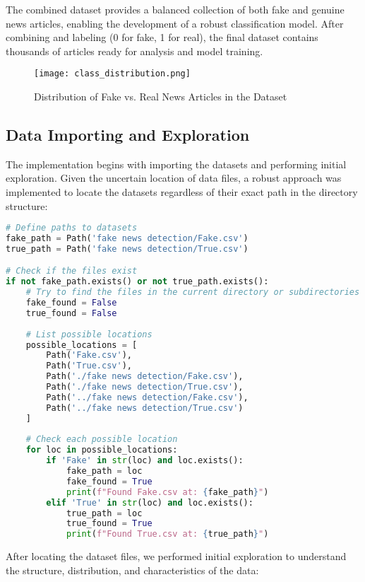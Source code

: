 \documentclass[12pt]{article}
\begin{document}
The combined dataset provides a balanced collection of both fake and genuine news articles, enabling the development of a robust classification model. After combining and labeling (0 for fake, 1 for real), the final dataset contains thousands of articles ready for analysis and model training.

\begin{figure}[h]
    \centering
    \texttt{[image: class\_distribution.png]}
    \caption{Distribution of Fake vs. Real News Articles in the Dataset}
\end{figure}

\subsection{Data Importing and Exploration}
The implementation begins with importing the datasets and performing initial exploration. Given the uncertain location of data files, a robust approach was implemented to locate the datasets regardless of their exact path in the directory structure:

\begin{lstlisting}[language=Python, caption=Robust Data Import Implementation]
# Define paths to datasets
fake_path = Path('fake news detection/Fake.csv')
true_path = Path('fake news detection/True.csv')

# Check if the files exist
if not fake_path.exists() or not true_path.exists():
    # Try to find the files in the current directory or subdirectories
    fake_found = False
    true_found = False
    
    # List possible locations
    possible_locations = [
        Path('Fake.csv'), 
        Path('True.csv'),
        Path('./fake news detection/Fake.csv'),
        Path('./fake news detection/True.csv'),
        Path('../fake news detection/Fake.csv'),
        Path('../fake news detection/True.csv')
    ]
    
    # Check each possible location
    for loc in possible_locations:
        if 'Fake' in str(loc) and loc.exists():
            fake_path = loc
            fake_found = True
            print(f"Found Fake.csv at: {fake_path}")
        elif 'True' in str(loc) and loc.exists():
            true_path = loc
            true_found = True
            print(f"Found True.csv at: {true_path}")
\end{lstlisting}

After locating the dataset files, we performed initial exploration to understand the structure, distribution, and characteristics of the data:
\end{document}
